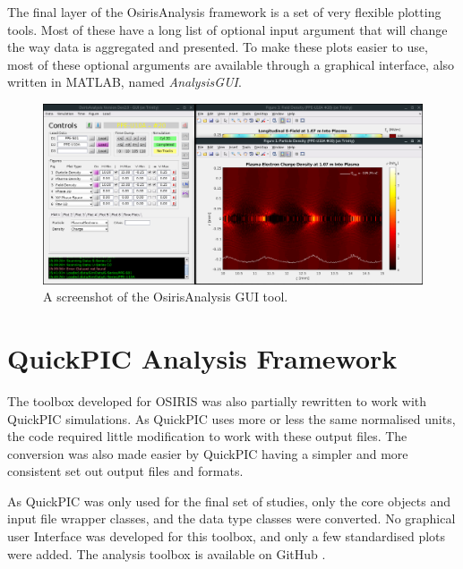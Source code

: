 The final layer of the OsirisAnalysis framework is a set of very flexible plotting tools.
Most of these have a long list of optional input argument that will change the way data is aggregated and presented.
To make these plots easier to use, most of these optional arguments are available through a graphical interface, also written in MATLAB, named \emph{AnalysisGUI}.

\begin{figure}[hbt]
    \centering
    \includegraphics[width=0.99\linewidth,trim={0mm 0mm 0mm 0mm},clip]{images/OsirisAnalysisGUI}
    \caption{\label{Fig:OAGUI} A screenshot of the OsirisAnalysis GUI tool.}
\end{figure}

\section{QuickPIC Analysis Framework}
\label{Tools:QA}

The toolbox developed for OSIRIS was also partially rewritten to work with QuickPIC simulations.
As QuickPIC uses more or less the same normalised units, the code required little modification to work with these output files.
The conversion was also made easier by QuickPIC having a simpler and more consistent set out output files and formats.

As QuickPIC was only used for the final set of studies, only the core objects and input file wrapper classes, and the data type classes were converted.
No graphical user Interface was developed for this toolbox, and only a few standardised plots were added.
The analysis toolbox is available on GitHub \cite{code:quickpic_analysis:2017}.

